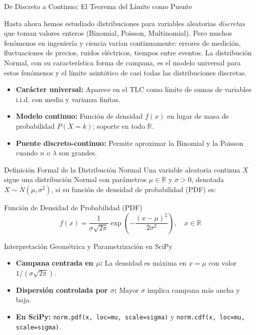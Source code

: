\documentclass[10pt, aspectratio=169]{beamer}
\begin{document}
\begin{frame}{De Discreto a Continuo: El Teorema del Límite como Puente}
  \footnotesize
  \begin{motivacion}
    Hasta ahora hemos estudiado distribuciones para variables aleatorias \emph{discretas} que toman valores enteros (Binomial, Poisson, Multinomial). Pero muchos fenómenos en ingeniería y ciencia varían continuamente: errores de medición, fluctuaciones de precios, ruidos eléctricos, tiempos entre eventos. La distribución Normal, con su característica forma de campana, es el modelo universal para estos fenómenos y el límite asintótico de casi todas las distribuciones discretas.
  \end{motivacion}

  \vspace{0.15cm}
  \pause
  \begin{itemize}\itemsep=0.1cm
    \item \textbf{Carácter universal:} Aparece en el TLC como límite de sumas de variables i.i.d. con media y varianza finitas. \pause
    \item \textbf{Modelo continuo:} Función de densidad $f(x)$ en lugar de masa de probabilidad $P(X=k)$; soporte en todo $\mathbb{R}$. \pause
    \item \textbf{Puente discreto-continuo:} Permite aproximar la Binomial y la Poisson cuando $n$ o $\lambda$ son grandes.
  \end{itemize}
\end{frame}

\begin{frame}{Definición Formal de la Distribución Normal}
  \footnotesize
  Una variable aleatoria continua $X$ sigue una distribución Normal con parámetros $\mu \in \mathbb{R}$ y $\sigma > 0$, denotada $X \sim N(\mu, \sigma^{2})$, si su función de densidad de probabilidad (PDF) es: \pause

  \vspace{0.1cm}
  \begin{block}{Función de Densidad de Probabilidad (PDF)}
    $$f(x) = \dfrac{1}{\sigma\sqrt{2\pi}} \exp\left(-\dfrac{(x - \mu)^{2}}{2\sigma^{2}}\right), \quad x \in \mathbb{R}$$
  \end{block}

  \vspace{0.1cm}
  \pause
  \begin{alertblock}{Interpretación Geométrica y Parametrización en SciPy}
    \begin{itemize}\itemsep=0.06cm
      \item \textbf{Campana centrada en $\mu$:} La densidad es máxima en $x = \mu$ con valor $1/(\sigma\sqrt{2\pi})$.
      \item \textbf{Dispersión controlada por $\sigma$:} Mayor $\sigma$ implica campana más ancha y baja.
      \item \textbf{En SciPy:} \texttt{norm.pdf(x, loc=mu, scale=sigma)} y \texttt{norm.cdf(x, loc=mu, scale=sigma)}.
    \end{itemize}
  \end{alertblock}
\end{frame}
\end{document}
